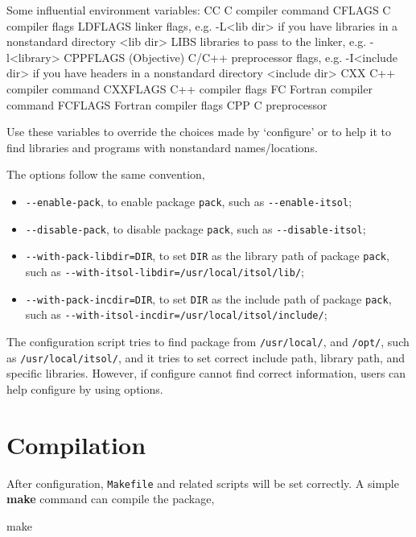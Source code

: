 \begin{evb}
Some influential environment variables:
  CC          C compiler command
  CFLAGS      C compiler flags
  LDFLAGS     linker flags, e.g. -L<lib dir> if you have libraries in a
              nonstandard directory <lib dir>
  LIBS        libraries to pass to the linker, e.g. -l<library>
  CPPFLAGS    (Objective) C/C++ preprocessor flags, e.g. -I<include dir> if
              you have headers in a nonstandard directory <include dir>
  CXX         C++ compiler command
  CXXFLAGS    C++ compiler flags
  FC          Fortran compiler command
  FCFLAGS     Fortran compiler flags
  CPP         C preprocessor

Use these variables to override the choices made by `configure' or to help
it to find libraries and programs with nonstandard names/locations.
\end{evb}

The options follow the same convention,
\begin{itemize}
\item \verb|--enable-pack|, to enable package \verb|pack|, such as \verb|--enable-itsol|;
\item \verb|--disable-pack|, to disable package \verb|pack|, such as \verb|--disable-itsol|;
\item \verb|--with-pack-libdir=DIR|, to set \verb|DIR| as the library path of package \verb|pack|, 
    such as \verb|--with-itsol-libdir=/usr/local/itsol/lib/|;
\item \verb|--with-pack-incdir=DIR|, to set \verb|DIR| as the include path of package \verb|pack|, 
    such as \verb|--with-itsol-incdir=/usr/local/itsol/include/|;
\end{itemize}

The configuration script tries to find package from \verb|/usr/local/|, and \verb|/opt/|,
such as \verb|/usr/local/itsol/|, and it tries to set correct include path, library path, and 
specific libraries. However, if configure cannot find correct information, 
users can help configure by using options.

\section{Compilation}
After configuration, \verb|Makefile| and related scripts will be set correctly.
A simple {\color{blue}\textbf{make}} command can compile the package,

\begin{evb}
make
\end{evb}

